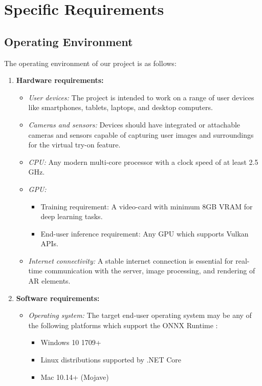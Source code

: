 \section{Specific Requirements}
	\subsection{Operating Environment}
		The operating environment of our project is as follows:

		\begin{enumerate}
			\item \textbf{Hardware requirements:}
				\begin{itemize}
					\item \textit{User devices:} The project is intended to work on a range of user devices like smartphones, tablets, laptops, and desktop computers.
					\item \textit{Cameras and sensors:} Devices should have integrated or attachable cameras and sensors capable of capturing user images and surroundings for the virtual try-on feature.
					\item \textit{CPU:} Any modern multi-core processor with a clock speed of at least 2.5 GHz.
					\item \textit{GPU:}
						\begin{itemize}
							\item Training requirement: A video-card with minimum 8GB VRAM for deep learning tasks.
							\item End-user inference requirement: Any GPU which supports Vulkan APIs.
						\end{itemize}
					\item \textit{Internet connectivity:} A stable internet connection is essential for real-time communication with the server, image processing, and rendering of AR elements.
				\end{itemize}
			\item \textbf{Software requirements:}
				\begin{itemize}
					\item \textit{Operating system:} The target end-user operating system may be any of the following platforms which support the ONNX Runtime \cite{onnxruntimeCompatibility}:
						\begin{itemize}
							\item Windows 10 1709+
							\item Linux distributions supported by .NET Core
							\item Mac 10.14+ (Mojave)

\end{itemize}
\end{itemize}
\end{enumerate}

